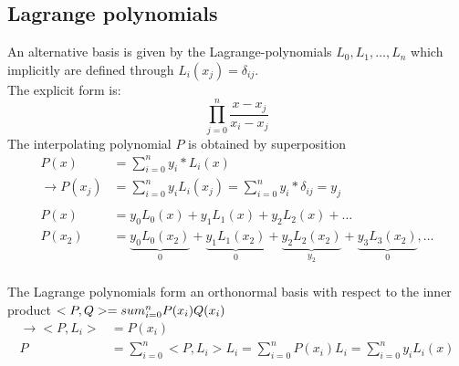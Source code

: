 \subsection{Lagrange polynomials}\label{subsec:lagrange-polynomials}
An alternative basis is given by the Lagrange-polynomials $L_0, L_1, \ldots, L_n$ which implicitly are defined through $L_i(x_j) = \delta_{ij}$.\\
The explicit form is:
\begin{equation*}
    \prod_{j=0}^n \frac{x-x_j}{x_i-x_j}
\end{equation*}
The interpolating polynomial $P$ is obtained by superposition
\begin{align*}
    P(x) &= \sum_{i=0}^{n}y_i*L_i(x)\\
    \to P(x_j)&=\sum_{i=0}^{n} y_i L_i(x_j)= \sum_{i=0}^{n} y_i * \delta_{ij} = y_j\\
    \\
    P(x) &= y_0 L_0 (x) + y_1 L_1 (x) + y_2 L_2 (x) + \ldots\\
    P(x_2) &= \underbrace{y_0 L_0
        (x_2)}_0 + \underbrace{y_1 L_1 (x_2)}_0 + \underbrace{y_2 L_2 (x_2)}_{y_2} + \underbrace{y_3 L_3 (x_2)}_0, \ldots\\
\end{align*}
\begin{remark}
    The Lagrange polynomials form an orthonormal basis with respect
    to the inner product $<P, Q>=\\sum_{i=0}^{n} P(x_i) Q(x_i)$
    \begin{align*}
        \to <P, L_i> &= P(x_i)\\
        P &= \sum_{i=0}^n <P, L_{i}> L_i = \sum_{i=0}^{n} P(x_i) L_i
        = \sum_{i=0}^{n} y_i L_i(x)
    \end{align*}
\end{remark}
\begin{example}
    
\end{example}


